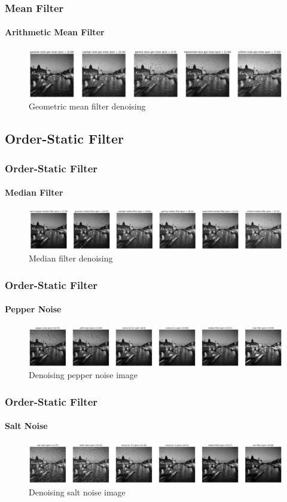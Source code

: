 \documentclass[
	11pt, %
	aspectratio=169, %
]{beamer}
\begin{document}
		\begin{frame}
			\frametitle{Mean Filter}
			\framesubtitle{Arithmetic Mean Filter}

			\begin{figure}[H]
				\includegraphics[width = \linewidth]{mean_filter_random_noise_2.png}
				\caption{Geometric mean filter denoising}
				\label{fig:geo_mean}
			\end{figure}
		\end{frame}

	\subsection{Order-Static Filter}

		\begin{frame}
			\frametitle{Order-Static Filter}
			\framesubtitle{Median Filter}

			\begin{figure}[H]
				\includegraphics[width = \linewidth]{median_filter_random_noise.png}
				\caption{Median filter denoising}
				\label{fig:median}
			 \end{figure}
		\end{frame}

		\begin{frame}
			\frametitle{Order-Static Filter}
			\framesubtitle{Pepper Noise}

			\begin{figure}[H]
				\includegraphics[width = \linewidth]{pepper_com.png}
				\caption{Denoising pepper noise image}
				\label{fig:pepper}
			 \end{figure}
		\end{frame}

		\begin{frame}
			\frametitle{Order-Static Filter}
			\framesubtitle{Salt Noise}

			\begin{figure}[H]
				\includegraphics[width = \linewidth]{salt_com.png}
				\caption{Denoising salt noise image}
				\label{fig:salt}
			 \end{figure}
		\end{frame}
\end{document}
